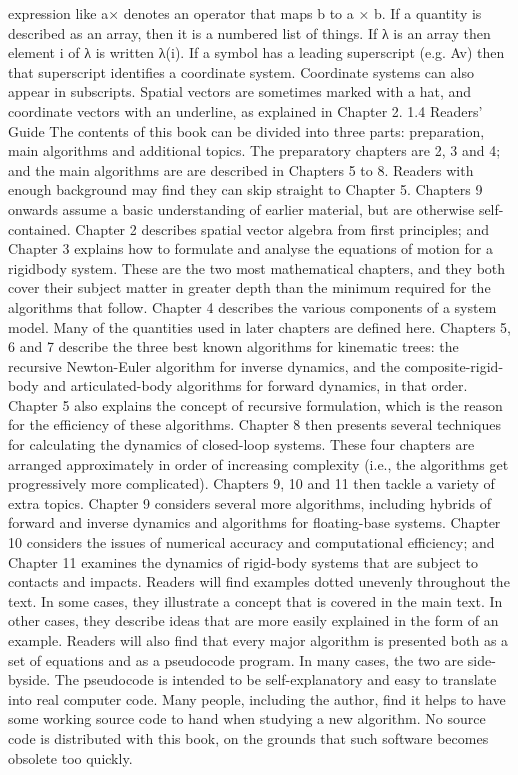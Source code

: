 expression like a× denotes an operator that maps b to a × b. If a quantity is described as an array, then it is a numbered list of things. If λ is an array then element i of λ is written λ(i). If a symbol has a leading superscript (e.g. Av) then that superscript identifies a coordinate system. Coordinate systems can also appear in subscripts. Spatial vectors are sometimes marked with a hat, and coordinate vectors with an underline, as explained in Chapter 2. 1.4 Readers’ Guide The contents of this book can be divided into three parts: preparation, main algorithms and additional topics. The preparatory chapters are 2, 3 and 4; and the main algorithms are are described in Chapters 5 to 8. Readers with enough background may find they can skip straight to Chapter 5. Chapters 9 onwards assume a basic understanding of earlier material, but are otherwise self-contained. Chapter 2 describes spatial vector algebra from first principles; and Chapter 3 explains how to formulate and analyse the equations of motion for a rigidbody system. These are the two most mathematical chapters, and they both cover their subject matter in greater depth than the minimum required for the algorithms that follow. Chapter 4 describes the various components of a system model. Many of the quantities used in later chapters are defined here. Chapters 5, 6 and 7 describe the three best known algorithms for kinematic trees: the recursive Newton-Euler algorithm for inverse dynamics, and the composite-rigid-body and articulated-body algorithms for forward dynamics, in that order. Chapter 5 also explains the concept of recursive formulation, which is the reason for the efficiency of these algorithms. Chapter 8 then presents several techniques for calculating the dynamics of closed-loop systems. These four chapters are arranged approximately in order of increasing complexity (i.e., the algorithms get progressively more complicated). Chapters 9, 10 and 11 then tackle a variety of extra topics. Chapter 9 considers several more algorithms, including hybrids of forward and inverse dynamics and algorithms for floating-base systems. Chapter 10 considers the issues of numerical accuracy and computational efficiency; and Chapter 11 examines the dynamics of rigid-body systems that are subject to contacts and impacts. Readers will find examples dotted unevenly throughout the text. In some cases, they illustrate a concept that is covered in the main text. In other cases, they describe ideas that are more easily explained in the form of an example. Readers will also find that every major algorithm is presented both as a set of equations and as a pseudocode program. In many cases, the two are side-byside. The pseudocode is intended to be self-explanatory and easy to translate into real computer code. Many people, including the author, find it helps to have some working source code to hand when studying a new algorithm. No source code is distributed with this book, on the grounds that such software becomes obsolete too quickly.


